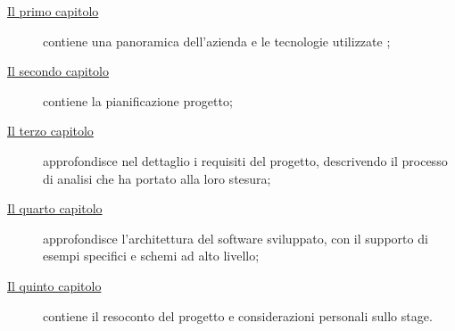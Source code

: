 \begin{description}
    \item[{\hyperref[cap:introduzione]{Il primo capitolo}}] contiene una panoramica dell'azienda e le tecnologie utilizzate \company{};

    \item[{\hyperref[cap:descrizione-stage]{Il secondo capitolo}}] contiene la pianificazione progetto; 
    
    \item[{\hyperref[cap:analisi-requisiti]{Il terzo capitolo}}] approfondisce nel dettaglio i requisiti del progetto, descrivendo il processo di analisi che ha portato alla loro stesura;
    
    \item[{\hyperref[cap:progettazione-codifica]{Il quarto capitolo}}] approfondisce l'architettura del software sviluppato, con il supporto di esempi specifici e schemi ad alto livello;
        
    \item[{\hyperref[cap:conclusioni]{Il quinto capitolo}}] contiene il resoconto del progetto e considerazioni personali sullo stage. 
\end{description}
